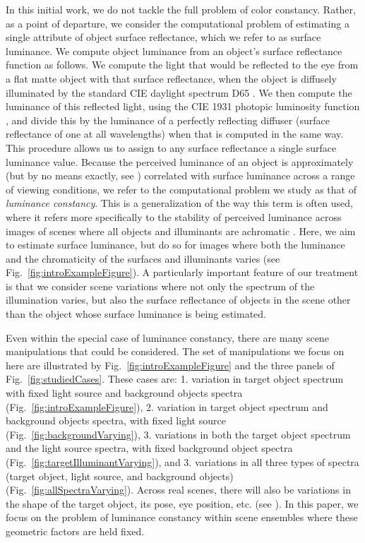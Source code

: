 \documentclass{jov}
\begin{document}
In this initial work, we do not tackle the full problem of color constancy.  Rather, as a point of departure, we consider the computational problem of estimating a single attribute of object surface reflectance, which we refer to as surface luminance.  We compute object luminance from an object's surface reflectance function as follows.  We compute the light that would be reflected to the eye from a flat matte object with that surface reflectance, when the object is diffusely illuminated by the standard CIE daylight spectrum D65 \cite{CIE86}.  We then compute the luminance of this reflected light, using the CIE 1931 photopic luminosity function \cite{CIE86}, and divide this by the luminance of a perfectly reflecting diffuser (surface reflectance of one at all wavelengths) when that is computed in the same way. This procedure allows us to assign to any surface reflectance a single surface luminance value.  Because the perceived luminance of an object is approximately (but by no means exactly, see ) correlated with surface luminance across a range of viewing conditions, we refer to the computational problem we study as that of {\em luminance constancy}.
This is a generalization of the way this term is often used, where it refers more specifically to the stability of perceived luminance across images of scenes where all objects and illuminants are achromatic \cite{gilchrist2006seeing}.
Here, we aim to estimate surface luminance, but do so for images where both the luminance and the chromaticity of the surfaces and illuminants varies (see  Fig.~\ref{fig:introExampleFigure}). A particularly important feature of our treatment is that we consider scene variations where not only the spectrum of the illumination varies, but also the surface reflectance of objects in the scene other than the object whose surface luminance is being estimated. 

Even within the special case of luminance constancy, there are many scene manipulations that could be considered. The set of manipulations we focus on here are illustrated by Fig.~\ref{fig:introExampleFigure} and the three panels of Fig.~\ref{fig:studiedCases}. These cases are: 1. variation in target object spectrum with fixed light source and background objects spectra (Fig.~\ref{fig:introExampleFigure}), 2. variation in target object spectrum and background objects spectra, with fixed light source  (Fig.~\ref{fig:backgroundVarying}), 3. variations in both the target object spectrum and the light source spectra, with fixed background object spectra (Fig.~\ref{fig:targetIlluminantVarying}), and 3. variations in all three types of spectra (target object, light source, and background objects) (Fig.~\ref{fig:allSpectraVarying}). Across real scenes, there will also be variations in the shape of the target object, its pose, eye position, etc. (see ). In this paper, we focus on the problem of luminance constancy within scene ensembles where these geometric factors are held fixed.
\end{document}

